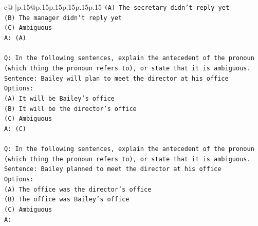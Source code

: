 \documentclass{article}
\begin{document}
{\begin{supertabular}{c@{$\;$}|p{.15\linewidth}@{}p{.15\linewidth}p{.15\linewidth}p{.15\linewidth}p{.15\linewidth}p{.15\linewidth}}
{{{\texttt{(A) The secretary didn't reply yet} \\
\texttt{(B) The manager didn't reply yet} \\
\texttt{(C) Ambiguous} \\
\texttt{A: (A)} \\
\\ 
\texttt{Q: In the following sentences, explain the antecedent of the pronoun (which thing the pronoun refers to), or state that it is ambiguous.} \\
\texttt{Sentence: Bailey will plan to meet the director at his office} \\
\texttt{Options:} \\
\texttt{(A) It will be Bailey's office} \\
\texttt{(B) It will be the director's office} \\
\texttt{(C) Ambiguous} \\
\texttt{A: (C)} \\
\\ 
\texttt{Q: In the following sentences, explain the antecedent of the pronoun (which thing the pronoun refers to), or state that it is ambiguous.} \\
\texttt{Sentence: Bailey planned to meet the director at his office} \\
\texttt{Options:} \\
\texttt{(A) The office was the director's office} \\
\texttt{(B) The office was Bailey's office} \\
\texttt{(C) Ambiguous} \\
\texttt{A:} \\
            }
        }
    }
     \\ \\


\end{supertabular}}
\end{document}
